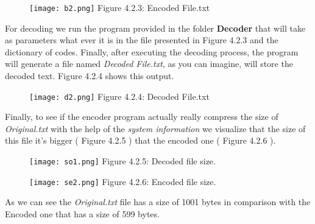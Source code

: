 \begin{figure}[H]
\texttt{[image: b2.png]}
\centering \linebreak \linebreak Figure 4.2.3: Encoded File.txt 
\end{figure} \hfill \break

For decoding we run the program provided in the folder {\bfseries Decoder} that will take as parameters what ever it is in the file presented in Figure 4.2.3 and the dictionary of codes. Finally, after executing the decoding process, the program will generate a file named {\itshape Decoded File.txt}, as you can imagine, will store the decoded text. Figure 4.2.4 shows this output. \hfill \break

\begin{figure}[H]
\texttt{[image: d2.png]}
\centering \linebreak \linebreak Figure 4.2.4: Decoded File.txt
\end{figure} \hfill \break

Finally, to see if the encoder program actually really compress the size of {\itshape Original.txt} with the help of the {\itshape system information} we visualize that the size of this file it's bigger ( Figure 4.2.5 ) that the encoded one ( Figure 4.2.6 ). \hfill \break

\begin{multicols}{2}
\begin{figure}[H]
\texttt{[image: so1.png]}
\centering \linebreak \linebreak Figure 4.2.5: Decoded file size.
\end{figure} \hfill \break

\begin{figure}[H]
\texttt{[image: se2.png]}
\centering \linebreak \linebreak Figure 4.2.6: Encoded file size.
\end{figure} \hfill \break
\end{multicols} 

As we can see the {\itshape Original.txt} file has a size of 1001 bytes in comparison with the Encoded one that has a size of 599 bytes.

\pagebreak